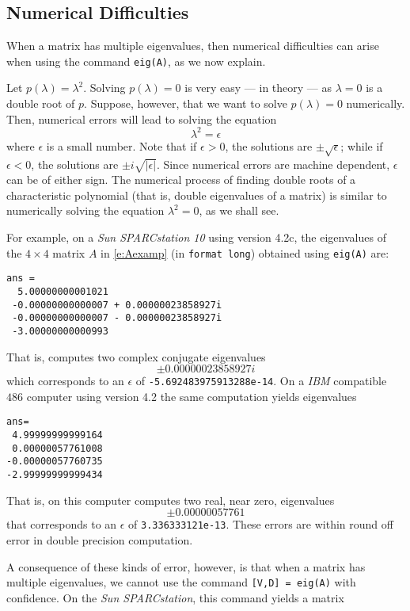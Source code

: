 \documentclass{ximera}
\begin{document}
\subsection*{Numerical Difficulties}

When a matrix has multiple eigenvalues, then numerical difficulties
can arise when using the \Matlab command {\tt eig(A)}, as we now explain.

Let $p(\lambda)=\lambda^2$.  Solving $p(\lambda)=0$ is very easy --- in theory
--- as $\lambda=0$ is a double root of $p$.  Suppose, however, that 
we want to solve $p(\lambda)=0$ numerically.  Then, numerical errors 
will lead to solving the equation  
\[
\lambda^2 = \epsilon
\]
where $\epsilon$ is a small number.  Note that if $\epsilon>0$, the 
solutions are $\pm\sqrt{\epsilon}$; while if $\epsilon<0$, the solutions 
are $\pm i\sqrt{|\epsilon|}$.  Since numerical errors are machine 
dependent, $\epsilon$ can be of either sign.  The numerical process of
finding double roots of a characteristic polynomial (that is, double 
eigenvalues of a matrix) is similar to numerically solving the equation 
$\lambda^2=0$, as we shall see.

For example, on a
{\em Sun SPARCstation 10\/} using \Matlab version 4.2c, the eigenvalues 
of the $4\times 4$ matrix $A$ in \eqref{e:Aexamp} (in {\tt format long}) 
obtained using {\tt eig(A)} are:
\begin{verbatim}
ans = 
  5.00000000001021                    
 -0.00000000000007 + 0.00000023858927i
 -0.00000000000007 - 0.00000023858927i
 -3.00000000000993       
\end{verbatim}
That is, \Matlab computes two complex conjugate eigenvalues
\[
\pm 0.00000023858927i
\]
which corresponds to an $\epsilon$ of {\tt -5.692483975913288e-14}.
On a {\em IBM\/} compatible $486$ computer using \Matlab version 4.2
the same computation yields eigenvalues
\begin{verbatim}
ans=
 4.99999999999164
 0.00000057761008
-0.00000057760735
-2.99999999999434
\end{verbatim}
That is, on this computer \Matlab computes two real, near zero, 
eigenvalues 
\[ 
\pm 0.00000057761
\]
that corresponds to an $\epsilon$ of {\tt 3.336333121e-13}. These
errors are within round off error in 
double precision computation.

A consequence of these kinds of error, however, is that when a matrix
has multiple eigenvalues, we cannot use the command {\tt [V,D] = eig(A)} 
with confidence. On the {\em Sun SPARCstation\/}, this command yields 
a matrix 
\end{document}

